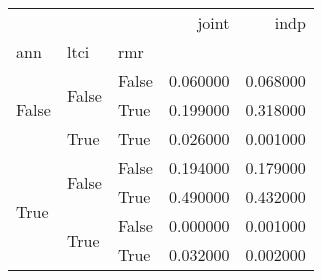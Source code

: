 \begin{tabular}{lllrr}
\toprule
 &  &  & joint & indp \\
ann & ltci & rmr &  &  \\
\midrule
\multirow[t]{3}{*}{False} & \multirow[t]{2}{*}{False} & False & 0.060000 & 0.068000 \\
 &  & True & 0.199000 & 0.318000 \\
\cline{2-5}
 & True & True & 0.026000 & 0.001000 \\
\cline{1-5} \cline{2-5}
\multirow[t]{4}{*}{True} & \multirow[t]{2}{*}{False} & False & 0.194000 & 0.179000 \\
 &  & True & 0.490000 & 0.432000 \\
\cline{2-5}
 & \multirow[t]{2}{*}{True} & False & 0.000000 & 0.001000 \\
 &  & True & 0.032000 & 0.002000 \\
\cline{1-5} \cline{2-5}
\bottomrule
\end{tabular}
